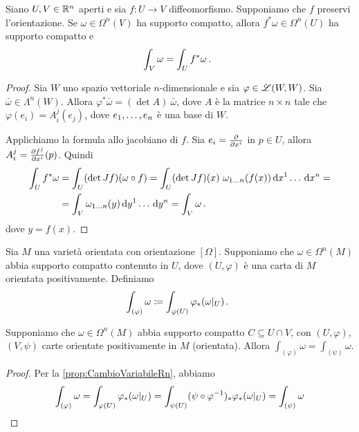 \begin{proposition} \label{prop:CambioVariabileRn}
	Siano $U,V\in\R^n$ aperti e sia $f:U\to V$ diffeomorfismo. Supponiamo che $f$ preservi l'orientazione. Se $\omega \in \Omega^n(V)$ ha supporto compatto, allora $f^*\omega \in \Omega^n(U)$ ha supporto compatto e 
	\begin{equation*}
		\int_V \omega = \int_U f^*\omega \punto
	\end{equation*}
\end{proposition}
\begin{proof}
	Sia $W$ uno spazio vettoriale $n$-dimensionale e sia $\varphi\in\Lin(W,W)$. Sia $\bar\omega \in \Lambda^n(W)$. Allora $\varphi^* \bar\omega = (\det A)\ \bar \omega$, dove $A$ è la matrice $n\times n$ tale che $\varphi(e_i) = A_i^j(e_j)$, dove $\seqb en,$ è una base di $W$.
	
	Applichiamo la formula allo jacobiano di $f$. Sia $e_i= \DerParz{}{x^i}$ in $p\in U$, allora $A_i^j = \DerParz{f^j}{x^i}(p)$. Quindi
	\begin{align*}
		\int_U f^*\omega &= \int_U (\det Jf)(\omega\circ f) = \int_U (\det Jf)(x)\ \omega_{1\ldots n}(f(x)) \seqa {\de x}n{} =\\
		&= \int_V \omega_{1\ldots n}(y) \seqa {\de y}n{} = \int_V \omega \punto
	\end{align*}
	dove $y=f(x)$.
\end{proof}

\begin{definition}
	Sia $M$ una varietà orientata con orientazione $[\Omega]$. Supponiamo che $\omega \in \Omega^n(M)$ abbia supporto compatto contenuto in $U$, dove $(U,\varphi)$ è una carta di $M$ orientata positivamente.
	Definiamo
	\begin{equation*}
		\int_{(\varphi)} \omega \coloneqq \int_{\varphi(U)} \varphi_*(\omega \restrict U) \punto
	\end{equation*}
\end{definition}

\begin{proposition}
	Supponiamo che $\omega\in \Omega^n(M)$ abbia supporto compatto $C\subseteq U\cap V$, con $(U,\varphi)$, $(V,\psi)$ carte orientate positivamente in $M$ (orientata).
	Allora $\int_{(\varphi)} \omega = \int_{(\psi)} \omega$.
\end{proposition}
\begin{proof}
	Per la \cref{prop:CambioVariabileRn}, abbiamo
	\begin{equation*}
		\int_{(\varphi)} \omega = \int_{\varphi(U)} \varphi_*(\omega\restrict U) = \int_{\psi(U)} (\psi\circ \varphi^{-1})_* \varphi_*(\omega \restrict U) = \int_{(\psi)} \omega
	\end{equation*}
\end{proof}

